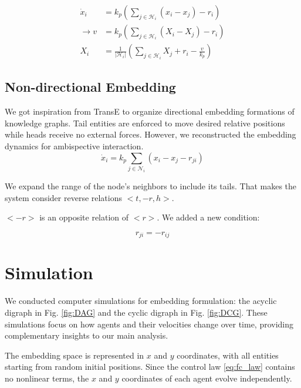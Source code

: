 \documentclass[letterpaper, 10 pt, conference]{ieeeconf}  %
\begin{document}
\begin{equation}
\begin{split}
\dot{x}_i &= k_p(\sum_{j \in \mathcal{H}_i} (x_i - x_j) -r_i) \\
\rightarrow v &= k_p(\sum_{j \in \mathcal{H}_i} (X_i - X_j) - r_i) \\
X_i &= \frac{1}{|\mathcal{H}_i|}(\sum_{j \in \mathcal{H}_i} X_j +r_i-\frac{v}{k_p})
\end{split}
\end{equation}

\subsection{Non-directional Embedding} 
We got inspiration from TransE to organize directional embedding formations of knowledge graphs. Tail entities are enforced to move desired relative positions while heads receive no external forces. However, we 
reconstructed the embedding dynamics for ambispective interaction. 
\begin{equation}
    \dot{x}_i = k_p \sum_{j \in \mathcal{N}_i} (x_i - x_j - r_{ji})
\end{equation}

We expand the range of the node's neighbors to include its tails. That makes the system consider reverse relations $ <t, -r, h> $. 

\noindent $<-r>$ is an opposite relation of $<r>$. We added a new condition:

\[r_{ji} = -r_{ij} \]



\section{Simulation}
We conducted computer simulations for embedding formulation: the acyclic digraph in Fig. \ref{fig:DAG} and the cyclic digraph in Fig. \ref{fig:DCG}. These simulations focus on how agents and their velocities change over time, providing complementary insights to our main analysis.

The embedding space is represented in $x$ and $y$ coordinates, with all entities starting from random initial positions. Since the control law \eqref{eq:fc_law} contains no nonlinear terms, the $x$ and $y$ coordinates of each agent evolve independently. %
\end{document}
